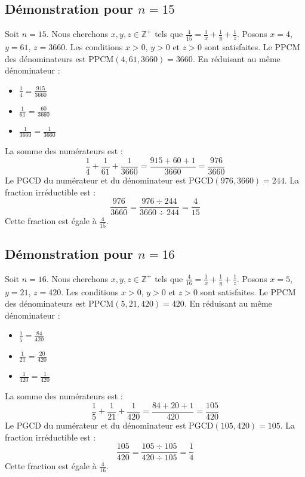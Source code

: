 \documentclass[11pt,a4paper]{article}
\begin{document}
\subsection{Démonstration pour $n = 15$}
Soit $n = 15$. Nous cherchons $x, y, z \in \mathbb{Z}^{+}$ tels que $\frac{4}{15} = \frac{1}{x} + \frac{1}{y} + \frac{1}{z}$.
Posons $x = 4$, $y = 61$, $z = 3660$.
Les conditions $x > 0$, $y > 0$ et $z > 0$ sont satisfaites.
Le PPCM des dénominateurs est $\text{PPCM}(4, 61, 3660) = 3660$.
En réduisant au même dénominateur :
\begin{itemize}
    \item $\frac{1}{4} = \frac{915}{3660}$
    \item $\frac{1}{61} = \frac{60}{3660}$
    \item $\frac{1}{3660} = \frac{1}{3660}$
\end{itemize}
La somme des numérateurs est :
$$ \frac{1}{4} + \frac{1}{61} + \frac{1}{3660} = \frac{915 + 60 + 1}{3660} = \frac{976}{3660} $$
Le PGCD du numérateur et du dénominateur est $\text{PGCD}(976, 3660) = 244$.
La fraction irréductible est :
$$ \frac{976}{3660} = \frac{976 \div 244}{3660 \div 244} = \frac{4}{15} $$
Cette fraction est égale à $\frac{4}{15}$.

\subsection{Démonstration pour $n = 16$}
Soit $n = 16$. Nous cherchons $x, y, z \in \mathbb{Z}^{+}$ tels que $\frac{4}{16} = \frac{1}{x} + \frac{1}{y} + \frac{1}{z}$.
Posons $x = 5$, $y = 21$, $z = 420$.
Les conditions $x > 0$, $y > 0$ et $z > 0$ sont satisfaites.
Le PPCM des dénominateurs est $\text{PPCM}(5, 21, 420) = 420$.
En réduisant au même dénominateur :
\begin{itemize}
    \item $\frac{1}{5} = \frac{84}{420}$
    \item $\frac{1}{21} = \frac{20}{420}$
    \item $\frac{1}{420} = \frac{1}{420}$
\end{itemize}
La somme des numérateurs est :
$$ \frac{1}{5} + \frac{1}{21} + \frac{1}{420} = \frac{84 + 20 + 1}{420} = \frac{105}{420} $$
Le PGCD du numérateur et du dénominateur est $\text{PGCD}(105, 420) = 105$.
La fraction irréductible est :
$$ \frac{105}{420} = \frac{105 \div 105}{420 \div 105} = \frac{1}{4} $$
Cette fraction est égale à $\frac{4}{16}$.
\end{document}

